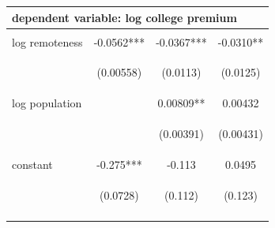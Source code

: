 \documentclass[12 pt]{article}
\renewcommand{\arraystretch}{.5}
\begin{document}
\begin{table}[H]
    \centering
    \setlength{\tabcolsep}{14pt} %
    \renewcommand{\arraystretch}{.8} %
    \begin{tabular}{lccc} \midrule
    \multicolumn{4}{l}{dependent variable: log college premium } \\ \midrule
	& \begin{footnotesize}\end{footnotesize} & \begin{footnotesize}\end{footnotesize} & \begin{footnotesize}\end{footnotesize} \\
    log remoteness & -0.0562*** & -0.0367*** & -0.0310** \\
    \vspace{4pt} & \begin{footnotesize}(0.00558)\end{footnotesize} & \begin{footnotesize}(0.0113)\end{footnotesize} & \begin{footnotesize}(0.0125)\end{footnotesize} \\
    log population &  & 0.00809** & 0.00432 \\
    \vspace{4pt} & \begin{footnotesize}\end{footnotesize} & \begin{footnotesize}(0.00391)\end{footnotesize} & \begin{footnotesize}(0.00431)\end{footnotesize} \\
    constant & -0.275*** & -0.113 & 0.0495 \\
     & \begin{footnotesize}(0.0728)\end{footnotesize} & \begin{footnotesize}(0.112)\end{footnotesize} & \begin{footnotesize}(0.123)\end{footnotesize} \\
    \vspace{4pt} & \begin{footnotesize}\end{footnotesize} & \begin{footnotesize}\end{footnotesize} & \begin{footnotesize}\end{footnotesize} \\

\end{tabular}
\end{table}
\end{document}
